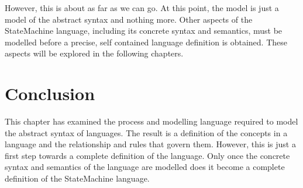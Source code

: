 However, this is about as far as we can go. At this point, the
model is just a model of the abstract syntax and nothing more.
Other aspects of the StateMachine language, including its concrete
syntax and semantics, must be modelled before a precise, self
contained language definition is obtained. These aspects will be
explored in the following chapters.

\section{Conclusion}

This chapter has examined the process and modelling language
required to model the abstract syntax of languages. The result is
a definition of the concepts in a language and the relationship
and rules that govern them. However, this is just a first step
towards a complete definition of the language. Only once the
concrete syntax and semantics of the language are modelled does it
become a complete definition of the StateMachine language.
